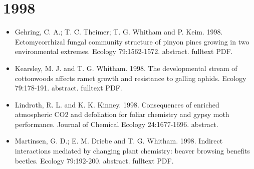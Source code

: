 \documentclass[12pt]{article}
\begin{document}
\section{1998}
\begin{itemize}
\item Gehring, C. A.; T. C. Theimer; T. G. Whitham and
P. Keim. 1998. Ectomycorrhizal fungal community structure of pinyon
pines growing in two environmental extremes. Ecology
79:1562-1572. abstract. fulltext PDF.
 
\item Kearsley, M. J. and T. G. Whitham. 1998. The developmental stream of
cottonwoods affects ramet growth and resistance to galling
aphids. Ecology 79:178-191. abstract. fulltext PDF.
 
\item Lindroth, R. L. and K. K. Kinney. 1998. Consequences of enriched
atmospheric CO2 and defoliation for foliar chemistry and gypsy moth
performance. Journal of Chemical Ecology 24:1677-1696. abstract.
 
\item Martinsen, G. D.; E. M. Driebe and T. G. Whitham. 1998. Indirect
interactions mediated by changing plant chemistry: beaver browsing
benefits beetles. Ecology 79:192-200. abstract. fulltext PDF.
 
\end{itemize}
\end{document}

